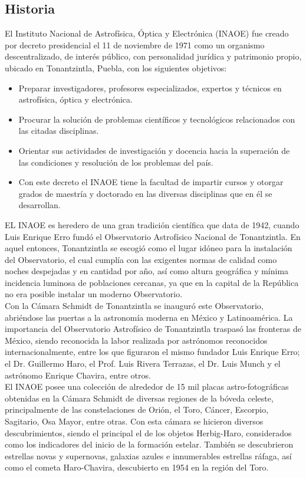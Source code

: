 \subsection{Historia}
El Instituto Nacional de Astrofísica, Óptica y Electrónica (INAOE) fue creado por decreto presidencial el 11 de noviembre de 1971 como un organismo descentralizado, de interés público, con personalidad jurídica y patrimonio propio, ubicado en Tonantzintla, Puebla, con los siguientes objetivos:
\begin{itemize}
	\item Preparar investigadores, profesores especializados, expertos y técnicos en astrofísica, óptica y electrónica.
	\item Procurar la solución de problemas científicos y tecnológicos relacionados con las citadas disciplinas.
	\item Orientar sus actividades de investigación y docencia hacia la superación de las condiciones y resolución de los problemas del país.
	\item Con este decreto el INAOE tiene la facultad de impartir cursos y otorgar grados de maestría y doctorado en las diversas disciplinas que en él se desarrollan.
\end{itemize}

EL INAOE es heredero de una gran tradición científica que data de 1942, cuando Luis Enrique Erro fundó el Observatorio Astrofísico Nacional de Tonantzintla. En aquel entonces, Tonantzintla se escogió como el lugar idóneo para la instalación del Observatorio, el cual cumplía con las exigentes normas de calidad como noches despejadas y en cantidad por año, así como altura geográfica y mínima incidencia luminosa de poblaciones cercanas, ya que en la capital de la República no era posible instalar un moderno Observatorio.
\\

Con la Cámara Schmidt de Tonantzintla se inauguró este Observatorio, abriéndose las puertas a la astronomía moderna en México y Latinoamérica. La importancia del Observatorio Astrofísico de Tonantzintla traspasó las fronteras de México, siendo reconocida la labor realizada por astrónomos reconocidos internacionalmente, entre los que figuraron el mismo fundador Luis Enrique Erro; el Dr. Guillermo Haro, el Prof. Luis Rivera Terrazas, el Dr. Luis Munch y el astrónomo Enrique Chavira, entre otros.
\\
 
El INAOE posee una colección de alrededor de 15 mil placas astro-fotográficas obtenidas en la Cámara Schmidt de diversas regiones de la bóveda celeste, principalmente de las constelaciones de Orión, el Toro, Cáncer, Escorpio, Sagitario, Osa Mayor, entre otras. Con esta cámara se hicieron diversos descubrimientos, siendo el principal el de los objetos Herbig-Haro, considerados como los indicadores del inicio de la formación estelar. También se descubrieron estrellas novas y supernovas, galaxias azules e innumerables estrellas ráfaga, así como el cometa Haro-Chavira, descubierto en 1954 en la región del Toro.
\\
  
